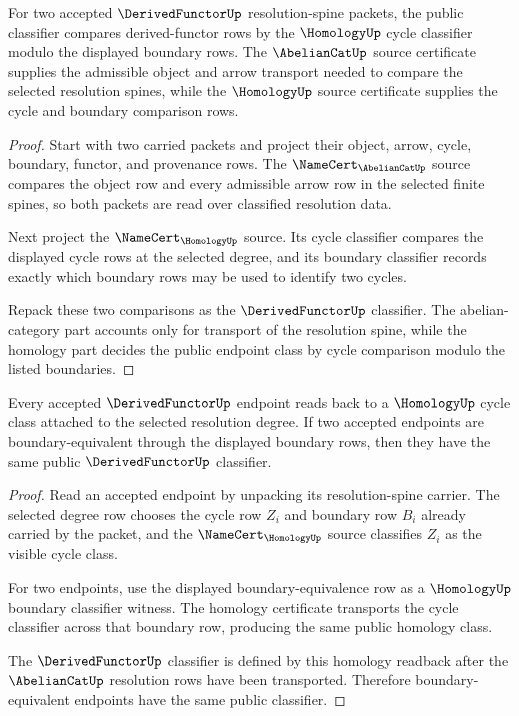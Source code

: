 \begin{theorem}\label{thm:derivedfunctor-cycle-boundary-classifier-obligation}
For two accepted $\DerivedFunctorUp$ resolution-spine packets, the public classifier compares derived-functor rows by the $\HomologyUp$ cycle classifier modulo the displayed boundary rows. The $\AbelianCatUp$ source certificate supplies the admissible object and arrow transport needed to compare the selected resolution spines, while the $\HomologyUp$ source certificate supplies the cycle and boundary comparison rows.
\end{theorem}
\begin{proof}
Start with two carried packets and project their object, arrow, cycle, boundary, functor, and provenance rows. The $\NameCert_{\AbelianCatUp}$ source compares the object row and every admissible arrow row in the selected finite spines, so both packets are read over classified resolution data.

Next project the $\NameCert_{\HomologyUp}$ source. Its cycle classifier compares the displayed cycle rows at the selected degree, and its boundary classifier records exactly which boundary rows may be used to identify two cycles.

Repack these two comparisons as the $\DerivedFunctorUp$ classifier. The abelian-category part accounts only for transport of the resolution spine, while the homology part decides the public endpoint class by cycle comparison modulo the listed boundaries.
\end{proof}

\begin{theorem}\label{thm:derivedfunctor-homology-readback-obligation}
Every accepted $\DerivedFunctorUp$ endpoint reads back to a $\HomologyUp$ cycle class attached to the selected resolution degree. If two accepted endpoints are boundary-equivalent through the displayed boundary rows, then they have the same public $\DerivedFunctorUp$ classifier.
\end{theorem}
\begin{proof}
Read an accepted endpoint by unpacking its resolution-spine carrier. The selected degree row chooses the cycle row $Z_i$ and boundary row $B_i$ already carried by the packet, and the $\NameCert_{\HomologyUp}$ source classifies $Z_i$ as the visible cycle class.

For two endpoints, use the displayed boundary-equivalence row as a $\HomologyUp$ boundary classifier witness. The homology certificate transports the cycle classifier across that boundary row, producing the same public homology class.

The $\DerivedFunctorUp$ classifier is defined by this homology readback after the $\AbelianCatUp$ resolution rows have been transported. Therefore boundary-equivalent endpoints have the same public classifier.
\end{proof}

